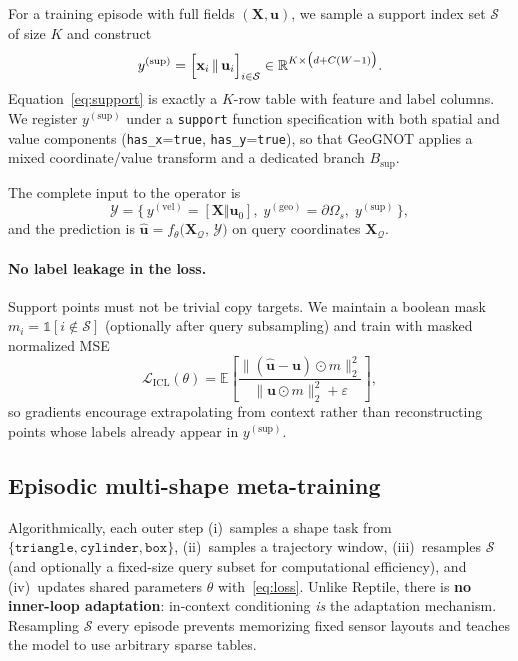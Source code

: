 \documentclass[11pt,a4paper]{article}
\begin{document}
For a training episode with full fields $(\mathbf{X},\mathbf{u})$, we sample a support index set $\mathcal{S}$ of size $K$ and construct
\begin{equation}
\label{eq:support}
y^{(\mathrm{sup})}
=\Bigl[\mathbf{x}_i\,\Vert\,\mathbf{u}_i\Bigr]_{i\in\mathcal{S}}
\in\mathbb{R}^{K\times\bigl(d+C(W-1)\bigr)}.
\end{equation}
Equation~\eqref{eq:support} is exactly a $K$-row table with feature and label columns.
We register $y^{(\mathrm{sup})}$ under a \texttt{support} function specification with both spatial and value components (\texttt{has\_x}=\texttt{true}, \texttt{has\_y}=\texttt{true}), so that GeoGNOT applies a mixed coordinate/value transform and a dedicated branch $B_{\mathrm{sup}}$.

The complete input to the operator is
\begin{equation}
\mathcal{Y}
=\bigl\{\,
y^{(\mathrm{vel})}=[\mathbf{X}\Vert\mathbf{u}_{0}],\;
y^{(\mathrm{geo})}=\partial\Omega_{s},\;
y^{(\mathrm{sup})}
\,\bigr\},
\end{equation}
and the prediction is $\hat{\mathbf{u}}=f_{\theta}\bigl(\mathbf{X}_{\mathcal{Q}},\,\mathcal{Y}\bigr)$ on query coordinates $\mathbf{X}_{\mathcal{Q}}$.

\paragraph{No label leakage in the loss.}
Support points must not be trivial copy targets.
We maintain a boolean mask $m_i=\mathbb{1}[i\notin\mathcal{S}]$ (optionally after query subsampling) and train with masked normalized MSE
\begin{equation}
\label{eq:loss}
\mathcal{L}_{\mathrm{ICL}}(\theta)
=\mathbb{E}\!\left[
\frac{\bigl\|(\hat{\mathbf{u}}-\mathbf{u})\odot m\bigr\|_2^{2}}
{\bigl\|\mathbf{u}\odot m\bigr\|_2^{2}+\varepsilon}
\right],
\end{equation}
so gradients encourage extrapolating from context rather than reconstructing points whose labels already appear in $y^{(\mathrm{sup})}$.

\subsection{Episodic multi-shape meta-training}
\label{sec:train}

Algorithmically, each outer step (i)~samples a shape task from $\{\texttt{triangle},\texttt{cylinder},\texttt{box}\}$, (ii)~samples a trajectory window, (iii)~resamples $\mathcal{S}$ (and optionally a fixed-size query subset for computational efficiency), and (iv)~updates shared parameters $\theta$ with~\eqref{eq:loss}.
Unlike Reptile, there is \textbf{no inner-loop adaptation}: in-context conditioning \emph{is} the adaptation mechanism.
Resampling $\mathcal{S}$ every episode prevents memorizing fixed sensor layouts and teaches the model to use arbitrary sparse tables.
\end{document}
